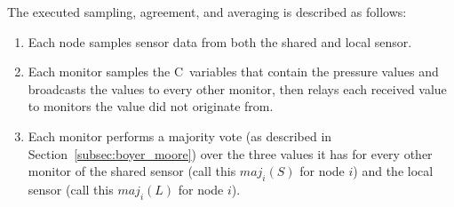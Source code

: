 The executed sampling, agreement, and averaging is described as follows:


\begin{enumerate}
\item Each node samples sensor data from both the shared and local sensor.
\item Each monitor samples the C~variables that contain the pressure values and
  broadcasts the values to every other monitor, then relays
  each received value to monitors the value did not originate from.
\item Each monitor performs a majority vote (as described in Section~\ref{subsec:boyer_moore})
  over the three values it has for every other monitor of the shared sensor
  (call this $maj_i(S)$ for node $i$) and the local sensor
  (call this $maj_i(L)$ for node $i$).






\end{enumerate}
